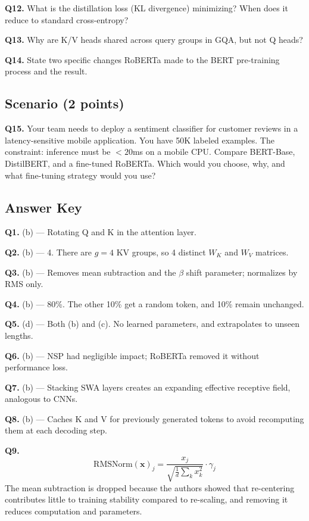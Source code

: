 \documentclass[11pt, a4paper]{article}
\begin{document}
\textbf{Q12.} What is the distillation loss (KL divergence) minimizing? When does it reduce to standard cross-entropy?

\textbf{Q13.} Why are K/V heads shared across query groups in GQA, but not Q heads?

\textbf{Q14.} State two specific changes RoBERTa made to the BERT pre-training process and the result.

\subsection*{Scenario (2 points)}

\textbf{Q15.} Your team needs to deploy a sentiment classifier for customer reviews in a latency-sensitive mobile application. You have 50K labeled examples. The constraint: inference must be $< 20$ms on a mobile CPU. Compare BERT-Base, DistilBERT, and a fine-tuned RoBERTa. Which would you choose, why, and what fine-tuning strategy would you use?

\newpage
\subsection*{Answer Key}

\textbf{Q1.} (b) --- Rotating Q and K in the attention layer.

\textbf{Q2.} (b) --- 4. There are $g=4$ KV groups, so 4 distinct $W_K$ and $W_V$ matrices.

\textbf{Q3.} (b) --- Removes mean subtraction and the $\beta$ shift parameter; normalizes by RMS only.

\textbf{Q4.} (b) --- 80\%. The other 10\% get a random token, and 10\% remain unchanged.

\textbf{Q5.} (d) --- Both (b) and (c). No learned parameters, and extrapolates to unseen lengths.

\textbf{Q6.} (b) --- NSP had negligible impact; RoBERTa removed it without performance loss.

\textbf{Q7.} (b) --- Stacking SWA layers creates an expanding effective receptive field, analogous to CNNs.

\textbf{Q8.} (b) --- Caches K and V for previously generated tokens to avoid recomputing them at each decoding step.

\textbf{Q9.}
\[
\text{RMSNorm}(\mathbf{x})_j = \frac{x_j}{\sqrt{\frac{1}{d}\sum_k x_k^2}} \cdot \gamma_j
\]
The mean subtraction is dropped because the authors showed that re-centering contributes little to training stability compared to re-scaling, and removing it reduces computation and parameters.
\end{document}
